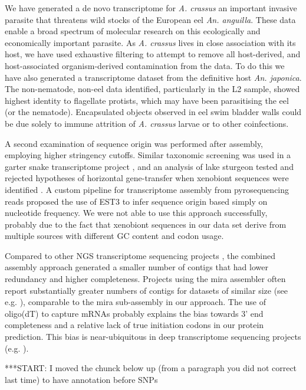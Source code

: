 \documentclass[10pt]{bmc_article}
\newenvironment{bmcformat}{\begin{raggedright}\baselineskip20pt\sloppy\setboolean{publ}{false}}{\end{raggedright}\baselineskip20pt\sloppy}
\begin{document}
\begin{bmcformat}
We have generated a de novo transcriptome for \textit{A. crassus} an
important invasive parasite that threatens wild stocks of the European
eel \textit{An. anguilla}. These data enable a broad spectrum of
molecular research on this ecologically and economically important
parasite. As \textit{A. crassus} lives in close association with its
host, we have used exhaustive filtering to attempt to remove all
host-derived, and host-associated organism-derived contamination from
the data. To do this we have also generated a transcriptome dataset
from the definitive host \textit{An. japonica}. The non-nematode,
non-eel data identified, particularly in the L2 sample, showed highest
identity to flagellate protists, which may have been parasitising the
eel (or the nematode). Encapsulated objects observed in eel swim
bladder walls \cite{heitlinger_massive_2009} could be due solely to
immune attrition of \textit{A. crassus} larvae or to other
coinfections.

A second examination of sequence origin was performed after assembly,
employing higher stringency cutoffs.  Similar taxonomic screening was
used in a garter snake transcriptome project \cite{pmid21138572}, and
an analysis of lake sturgeon tested and rejected hypotheses of
horizontal gene-transfer when xenobiont sequences were identified
\cite{pmid20386959}. A custom pipeline for transcriptome assembly from
pyrosequencing reads \cite{pmid20034392} proposed the use of EST3
\cite{pmid17218127} to infer sequence origin based simply on
nucleotide frequency. We were not able to use this approach
successfully, probably due to the fact that xenobiont sequences in our
data set derive from multiple sources with different GC content and
codon usage.

Compared to other NGS transcriptome sequencing projects
\cite{pmid20478048}, the combined assembly approach generated a
smaller number of contigs that had lower redundancy and higher
completeness. Projects using the mira assembler often report
substantially greater numbers of contigs for datasets of similar size
(see e.g. \cite{pmid21364769}), comparable to the mira sub-assembly in
our approach. The use of oligo(dT) to capture mRNAs probably explains
the bias towards 3' end completeness and a relative lack of true
initiation codons in our protein prediction. This bias is
near-ubiquitous in deep transcriptome sequencing projects
(e.g. \cite{pmid20331785}).

***START: I moved the chunck below up (from a paragraph you did not
correct last time) to have annotation before SNPs


\end{bmcformat}
\end{document}
